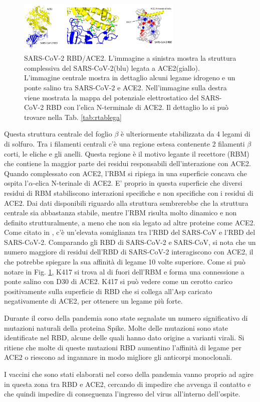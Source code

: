 \begin{figure}
	\centering
	\includegraphics[width=0.7\textwidth]{Immagini/RBD-ACE2.png}
	\caption{SARS-CoV-2 RBD/ACE2. L'immagine a sinistra mostra la struttura complessiva del SARS-CoV-2(blu) legata a ACE2(giallo). L'immagine centrale mostra in dettaglio alcuni legame idrogeno e un ponte salino tra SARS-CoV-2 e ACE2. Nell'immagine sulla destra viene mostrata la mappa del potenziale elettrostatico del SARS-CoV-2 RBD con l'elica N-terminale di ACE2. Il dettaglio lo si può trovare nella Tab. \ref{tab:rtablega}}
	\label{fig:RBDstructure}
\end{figure}

Questa struttura centrale del foglio $\beta$ è ulteriormente stabilizzata da 4 legami di di solfuro. Tra i filamenti centrali c'è una regione estesa contenente 2 filamenti $\beta$ corti, le eliche e gli anelli. Questa regione è il motivo legante il recettore (RBM) che contiene la maggior parte dei residui responsabili dell'interazione con ACE2. Quando complessato con ACE2, l'RBM si ripiega in una superficie concava che ospita l'$\alpha$-elica N-terinale di ACE2. E' proprio in questa superficie che diversi residui di RBM stabiliscono interazioni specifiche e non specifiche con i residui di ACE2. Dai dati disponibili riguardo alla struttura sembrerebbe che la struttura centrale sia abbastanza stabile, mentre l'RBM risulta molto dinamico e non definito strutturalmente, a meno che non sia legato ad altre proteine come ACE2. Come citato in \cite{ijms22147425}, c'è un'elevata somiglianza tra l'RBD del SARS-CoV e l'RBD del SARS-CoV-2. Comparando gli RBD di SARS-CoV-2 e SARS-CoV, si nota che un numero maggiore di residui dell'RBD di SARS-CoV-2 interagiscono con ACE2, il che potrebbe spiegare la sua affinità di legame 10 volte superiore. Come si può notare in Fig. \ref{fig:RBDstructure},
K417 si trova al di fuori dell'RBM e forma una connessione a ponte salino con D30 di ACE2. K417 si può vedere come un cerotto carico positivamente sulla superficie di RBD che si collega all'Asp caricato negativamente di ACE2, per ottenere un legame più forte.

Durante il corso della pandemia sono state segnalate un numero significativo di mutazioni naturali della proteina Spike. Molte delle mutazioni sono state identificate nel RBD, alcune delle quali hanno dato origine a varianti virali. Si ritiene che molte di queste mutazioni RBD aumentino l'affinità di legame per ACE2 o riescono ad ingannare in modo migliore gli anticorpi monoclonali.  

I vaccini che sono stati elaborati nel corso della pandemia vanno proprio ad agire in questa zona tra RBD e ACE2, cercando di impedire che avvenga il contatto e che quindi impedire di conseguenza l'ingresso del virus all'interno dell'ospite.
